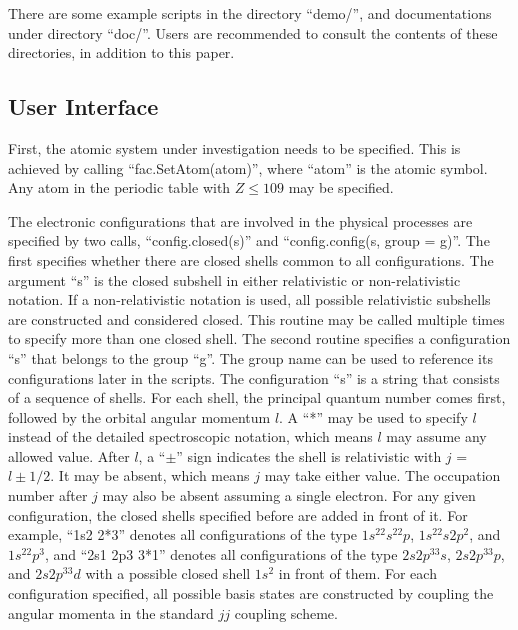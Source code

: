\documentclass{elsart}
\begin{document}
There are some example scripts in the directory ``demo/'', and documentations
under directory ``doc/''. Users are recommended to consult the contents of
these directories, in addition to this paper. 

\subsection{User Interface}
First, the atomic system under investigation needs to be specified. This is
achieved by calling ``fac.SetAtom(atom)'', where ``atom'' is the atomic
symbol. Any atom in the periodic table with $Z \le 109$ may be specified. 

The electronic configurations that are involved in the physical processes are
specified by two calls, ``config.closed(s)'' and ``config.config(s, group =
g)''. The first specifies whether there are closed shells common to all
configurations. The argument ``s'' is the closed subshell in either
relativistic or non-relativistic notation. If a non-relativistic notation is
used, all possible relativistic subshells are constructed and considered
closed. This routine may be called multiple times to specify more than one
closed shell. The second routine specifies a configuration ``s'' that belongs
to the group ``g''. The group name can be used to reference its configurations
later in the scripts. The configuration ``s'' is a string that consists of a
sequence of shells. For each shell, the principal quantum 
number comes first, followed by the orbital angular momentum $l$. A ``*'' may
be used to specify $l$ instead of the detailed spectroscopic notation, which
means $l$ may assume any allowed value. After $l$,  a ``$\pm$'' sign
indicates the shell is relativistic with $j$ = $l\pm 1/2$. It may be absent,
which means $j$ may take either value. The occupation number after $j$ may
also be absent assuming a single electron. For any given configuration, the
closed shells specified before are added in front of it. For example, ``1s2
2*3'' denotes all configurations of the type $1s^22s^22p$, $1s^22s2p^2$, and
$1s^22p^3$, and ``2s1 2p3 3*1'' denotes all configurations of the type
$2s2p^33s$, $2s2p^33p$, and $2s2p^33d$ with a possible closed shell $1s^2$ in
front of them. For each configuration specified, all possible basis states
are constructed by coupling the angular momenta in the standard $jj$ coupling
scheme. 
\end{document}
